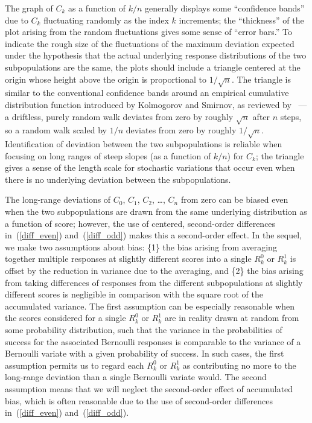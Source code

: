 \documentclass{article}
\begin{document}
The graph of $C_k$ as a function of $k/n$ generally displays
some ``confidence bands'' due to $C_k$ fluctuating randomly
as the index $k$ increments; the ``thickness'' of the plot
arising from the random fluctuations gives some sense of ``error bars.''
To indicate the rough size of the fluctuations
of the maximum deviation expected under the hypothesis that
the actual underlying response distributions of the two subpopulations
are the same, the plots should include a triangle centered at the origin
whose height above the origin is proportional to $1/\sqrt{n}$.
The triangle is similar to the conventional confidence bands
around an empirical cumulative distribution function
introduced by Kolmogorov and Smirnov, as reviewed by~\cite{doksum}
--- a driftless, purely random walk deviates from zero
by roughly $\sqrt{n}$ after $n$ steps, so a random walk scaled by $1/n$
deviates from zero by roughly $1/\sqrt{n}$.
Identification of deviation between the two subpopulations
is reliable when focusing on long ranges of steep slopes
(as a function of $k/n$) for $C_k$; the triangle gives a sense
of the length scale for stochastic variations that occur
even when there is no underlying deviation between the subpopulations.

The long-range deviations of $C_0$, $C_1$, $C_2$, \dots, $C_n$ from zero
can be biased even when the two subpopulations are drawn
from the same underlying distribution as a function of score;
however, the use of centered, second-order differences in~(\ref{diff_even})
and~(\ref{diff_odd}) makes this a second-order effect.
In the sequel, we make two assumptions about bias:
\{1\} the bias arising from averaging together multiple responses
at slightly different scores into a single $R^0_k$ or $R^1_k$ is offset
by the reduction in variance due to the averaging, and
\{2\} the bias arising from taking differences of responses
from the different subpopulations at slightly different scores
is negligible in comparison with the square root of the accumulated variance.
The first assumption can be especially reasonable when the scores
considered for a single $R^0_k$ or $R^1_k$
are in reality drawn at random from some probability distribution,
such that the variance in the probabilities of success
for the associated Bernoulli responses is comparable
to the variance of a Bernoulli variate with a given probability of success.
In such cases, the first assumption permits us to regard each $R^0_k$
or $R^1_k$ as contributing no more to the long-range deviation
than a single Bernoulli variate would.
The second assumption means that we will neglect
the second-order effect of accumulated bias,
which is often reasonable due to the use of second-order differences
in~(\ref{diff_even}) and~(\ref{diff_odd}).
\end{document}
